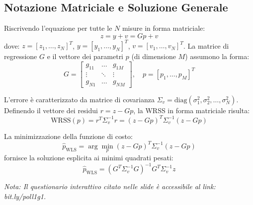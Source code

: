 \subsection{Notazione Matriciale e Soluzione Generale}
Riscrivendo l'equazione per tutte le $N$ misure in forma matriciale:
\begin{equation}
    z = y + v = Gp + v
\end{equation}
dove:
$z = [z_1, \dots, z_N]^T$, $y = [y_1, \dots, y_N]^T$, $v = [v_1, \dots, v_N]^T$.
La matrice di regressione $G$ e il vettore dei parametri $p$ (di dimensione $M$) assumono la forma:
\begin{equation}
    G = \begin{bmatrix}
    g_{11} & \dots & g_{1M} \\
    \vdots & \ddots & \vdots \\
    g_{N1} & \dots & g_{NM}
    \end{bmatrix}, \quad p = [p_1, \dots, p_M]^T
\end{equation}

L'errore è caratterizzato da matrice di covarianza $\Sigma_v = \text{diag}(\sigma_1^2, \sigma_2^2, \dots, \sigma_N^2)$.
Definendo il vettore dei residui $r = z - Gp$, la WRSS in forma matriciale risulta:
\begin{equation}
    \text{WRSS}(p) = r^T \Sigma_v^{-1} r = (z - Gp)^T \Sigma_v^{-1} (z - Gp)
\end{equation}

La minimizzazione della funzione di costo:
\begin{equation}
    \hat{p}_{\text{WLS}} = \arg \min_p (z - Gp)^T \Sigma_v^{-1} (z - Gp)
\end{equation}
fornisce la soluzione esplicita ai minimi quadrati pesati:
\begin{equation}
    \hat{p}_{\text{WLS}} = (G^T \Sigma_v^{-1} G)^{-1} G^T \Sigma_v^{-1} z
\end{equation}

\vspace{1cm}
\noindent \textit{Nota: Il questionario interattivo citato nelle slide è accessibile al link: bit.ly/poll1g1.}
